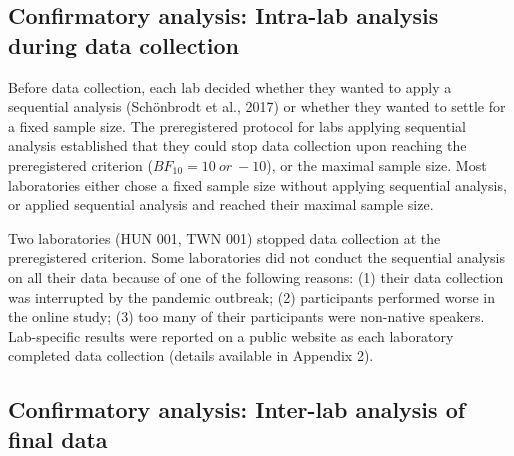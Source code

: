 \documentclass[
  man]{apa6}
\begin{document}
\hypertarget{confirmatory-analysis-intra-lab-analysis-during-data-collection}{%
\subsection{Confirmatory analysis: Intra-lab analysis during data collection}\label{confirmatory-analysis-intra-lab-analysis-during-data-collection}}

Before data collection, each lab decided whether they wanted to apply a sequential analysis (Schönbrodt et al., 2017) or whether they wanted to settle for a fixed sample size. The preregistered protocol for labs applying sequential analysis established that they could stop data collection upon reaching the preregistered criterion (\(BF_{10} = 10\ or\ -10\)), or the maximal sample size. Most laboratories either chose a fixed sample size without applying sequential analysis, or applied sequential analysis and reached their maximal sample size.

Two laboratories (HUN 001, TWN 001) stopped data collection at the preregistered criterion. Some laboratories did not conduct the sequential analysis on all their data because of one of the following reasons: (1) their data collection was interrupted by the pandemic outbreak; (2) participants performed worse in the online study; (3) too many of their participants were non-native speakers. Lab-specific results were reported on a public website as each laboratory completed data collection (details available in Appendix 2).

\hypertarget{confirmatory-analysis-inter-lab-analysis-of-final-data}{%
\subsection{Confirmatory analysis: Inter-lab analysis of final data}\label{confirmatory-analysis-inter-lab-analysis-of-final-data}}
\end{document}
